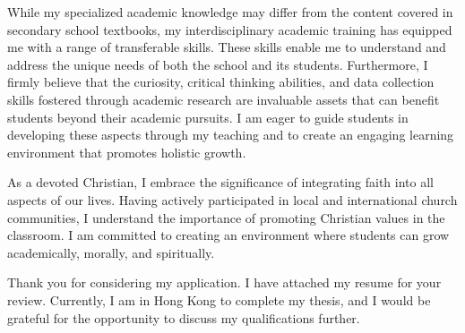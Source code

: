 \documentclass[11pt, a4paper]{awesome-cv}
\begin{document}
\begin{cvletter}
While my specialized academic knowledge may differ from the content covered in secondary school textbooks, my interdisciplinary academic training has equipped me with a range of transferable skills. These skills enable me to understand and address the unique needs of both the school and its students. Furthermore, I firmly believe that the curiosity, critical thinking abilities, and data collection skills fostered through academic research are invaluable assets that can benefit students beyond their academic pursuits. I am eager to guide students in developing these aspects through my teaching and to create an engaging learning environment that promotes holistic growth.

As a devoted Christian, I embrace the significance of integrating faith into all aspects of our lives. Having actively participated in
local and international church communities, I understand the importance of promoting Christian values in the classroom. I am
committed to creating an environment where students can grow academically, morally, and spiritually.

Thank you for considering my application. I have attached my resume for your review. Currently, I am in Hong Kong to complete my thesis, and I would be grateful for the opportunity to discuss my qualifications further.


\end{cvletter}


\makeletterclosing
\end{document}
